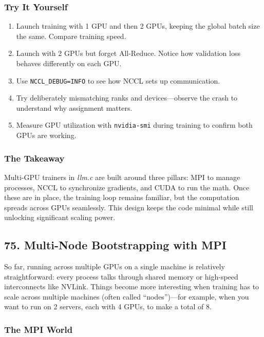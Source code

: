 \documentclass[
  letterpaper,
  DIV=11,
  numbers=noendperiod]{scrreprt}
\providecommand{\tightlist}{%
  \setlength{\itemsep}{0pt}\setlength{\parskip}{0pt}}
\begin{document}
\subsubsection{Try It Yourself}\label{try-it-yourself-62}

\begin{enumerate}
\def\labelenumi{\arabic{enumi}.}
\tightlist
\item
  Launch training with 1 GPU and then 2 GPUs, keeping the global batch
  size the same. Compare training speed.
\item
  Launch with 2 GPUs but forget All-Reduce. Notice how validation loss
  behaves differently on each GPU.
\item
  Use \texttt{NCCL\_DEBUG=INFO} to see how NCCL sets up communication.
\item
  Try deliberately mismatching ranks and devices---observe the crash to
  understand why assignment matters.
\item
  Measure GPU utilization with \texttt{nvidia-smi} during training to
  confirm both GPUs are working.
\end{enumerate}

\subsubsection{The Takeaway}\label{the-takeaway-63}

Multi-GPU trainers in \emph{llm.c} are built around three pillars: MPI
to manage processes, NCCL to synchronize gradients, and CUDA to run the
math. Once these are in place, the training loop remains familiar, but
the computation spreads across GPUs seamlessly. This design keeps the
code minimal while still unlocking significant scaling power.

\subsection{75. Multi-Node Bootstrapping with
MPI}\label{multi-node-bootstrapping-with-mpi}

So far, running across multiple GPUs on a single machine is relatively
straightforward: every process talks through shared memory or high-speed
interconnects like NVLink. Things become more interesting when training
has to scale across multiple machines (often called ``nodes'')---for
example, when you want to run on 2 servers, each with 4 GPUs, to make a
total of 8.

\subsubsection{The MPI World}\label{the-mpi-world}
\end{document}

